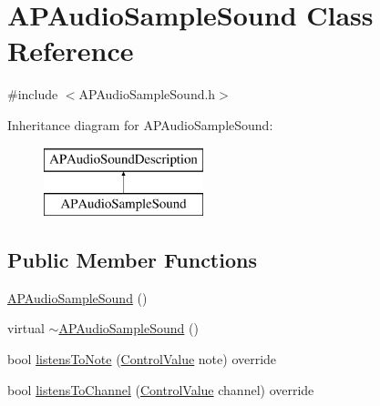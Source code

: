 \hypertarget{class_a_p_audio_sample_sound}{\section{A\+P\+Audio\+Sample\+Sound Class Reference}
\label{class_a_p_audio_sample_sound}
}


{\ttfamily \#include $<$A\+P\+Audio\+Sample\+Sound.\+h$>$}

Inheritance diagram for A\+P\+Audio\+Sample\+Sound\+:\begin{figure}[H]
\begin{center}
\leavevmode
\includegraphics[height=2.000000cm]{class_a_p_audio_sample_sound}
\end{center}
\end{figure}
\subsection*{Public Member Functions}
\begin{DoxyCompactItemize}
\item 
\hyperlink{class_a_p_audio_sample_sound_a2e67be5d19815f8ad292a1622deb522e}{A\+P\+Audio\+Sample\+Sound} ()
\item 
virtual \hyperlink{class_a_p_audio_sample_sound_ad791ba969a5f25573252e893d9bcbdcc}{$\sim$\+A\+P\+Audio\+Sample\+Sound} ()
\item 
bool \hyperlink{class_a_p_audio_sample_sound_a08d23ea13830a9251d638c77b5426e0d}{listens\+To\+Note} (\hyperlink{_a_p_audio_module_8h_a9219378a2632ccf0389d00317ce8cdc4}{Control\+Value} note) override
\item 
bool \hyperlink{class_a_p_audio_sample_sound_a7498818340851d93745bc0d4946532f3}{listens\+To\+Channel} (\hyperlink{_a_p_audio_module_8h_a9219378a2632ccf0389d00317ce8cdc4}{Control\+Value} channel) override
\end{DoxyCompactItemize}


